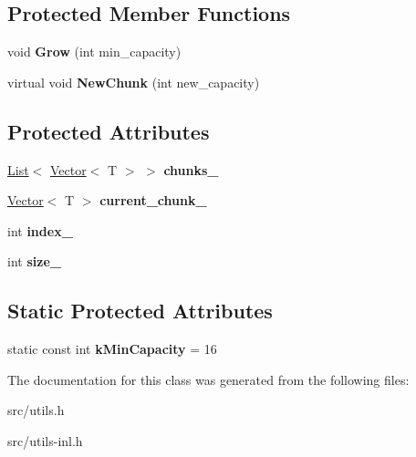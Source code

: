 \subsection*{Protected Member Functions}
\begin{DoxyCompactItemize}
\item 
\hypertarget{classv8_1_1internal_1_1_collector_a64538c3871b9027c063536b7422e4934}{}void {\bfseries Grow} (int min\+\_\+capacity)\label{classv8_1_1internal_1_1_collector_a64538c3871b9027c063536b7422e4934}

\item 
\hypertarget{classv8_1_1internal_1_1_collector_ae5c13b4d64ac101f050251ce9b9f633e}{}virtual void {\bfseries New\+Chunk} (int new\+\_\+capacity)\label{classv8_1_1internal_1_1_collector_ae5c13b4d64ac101f050251ce9b9f633e}

\end{DoxyCompactItemize}
\subsection*{Protected Attributes}
\begin{DoxyCompactItemize}
\item 
\hypertarget{classv8_1_1internal_1_1_collector_ab31539f889091d726729e118118fcbb5}{}\hyperlink{classv8_1_1internal_1_1_list}{List}$<$ \hyperlink{classv8_1_1internal_1_1_vector}{Vector}$<$ T $>$ $>$ {\bfseries chunks\+\_\+}\label{classv8_1_1internal_1_1_collector_ab31539f889091d726729e118118fcbb5}

\item 
\hypertarget{classv8_1_1internal_1_1_collector_ae18ddaaf7f76b38ad5fc776374f8e54b}{}\hyperlink{classv8_1_1internal_1_1_vector}{Vector}$<$ T $>$ {\bfseries current\+\_\+chunk\+\_\+}\label{classv8_1_1internal_1_1_collector_ae18ddaaf7f76b38ad5fc776374f8e54b}

\item 
\hypertarget{classv8_1_1internal_1_1_collector_a450843df09b65a6b00a2dbd1df9f6dd1}{}int {\bfseries index\+\_\+}\label{classv8_1_1internal_1_1_collector_a450843df09b65a6b00a2dbd1df9f6dd1}

\item 
\hypertarget{classv8_1_1internal_1_1_collector_a18fc8b51241e805a2980ba8aaacc1c5b}{}int {\bfseries size\+\_\+}\label{classv8_1_1internal_1_1_collector_a18fc8b51241e805a2980ba8aaacc1c5b}

\end{DoxyCompactItemize}
\subsection*{Static Protected Attributes}
\begin{DoxyCompactItemize}
\item 
\hypertarget{classv8_1_1internal_1_1_collector_a559be84477f49672e512b636e6b6d8bb}{}static const int {\bfseries k\+Min\+Capacity} = 16\label{classv8_1_1internal_1_1_collector_a559be84477f49672e512b636e6b6d8bb}

\end{DoxyCompactItemize}


The documentation for this class was generated from the following files\+:\begin{DoxyCompactItemize}
\item 
src/utils.\+h\item 
src/utils-\/inl.\+h\end{DoxyCompactItemize}
